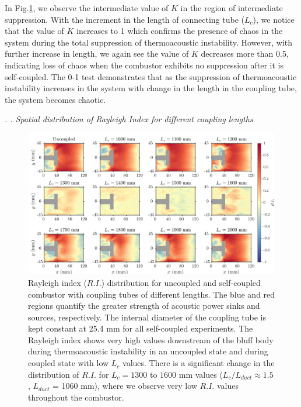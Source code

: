 \documentclass[onecolumn,12pt]{article} %
\renewcommand{\subsection}%
              [1]%
              {%
               \bgroup%
               \flushleft%
               \small\em%
               \stepcounter{subsection}%
               \arabic{section}.%
               \arabic{subsection}. #1%
               \par%
               \egroup%
              }%
\begin{document}
In Fig.\ref{chaos_fig}, we observe the intermediate value of $K$ in the region of intermediate suppression. With the increment in the length of connecting tube ($L_c$), we notice that the value of $K$ increases to 1 which confirms the presence of chaos in the system during the total suppression of thermoacoustic instability. However, with further increase in length, we again see the value of $K$ decreases more than 0.5, indicating loss of chaos when the combustor exhibits no suppression after it is self-coupled. The 0-1 test demonstrates that as the suppression of thermoacoustic instability increases in the system with change in the length in the coupling tube, the system becomes chaotic.  

\subsection{Spatial distribution of Rayleigh Index for different coupling lengths} \addvspace{10pt}

\begin{figure}[h]
\centering
\includegraphics[width=1\textwidth]{rayleigh_index_plots.png}
\caption{Rayleigh index ($R.I.$) distribution for uncoupled and self-coupled combustor with coupling tubes of different lengths. The blue and red regions quantify the greater strength of acoustic power sinks and sources, respectively. The internal diameter of the coupling tube is kept constant at 25.4 mm for all self-coupled experiments. The Rayleigh index shows very high values downstream of the bluff body during thermoacoustic instability in an uncoupled state and during coupled state with low $L_c$ values. There is a significant change in the distribution of $R.I.$ for $L_c = 1300$ to $1600$ mm values ($L_c/L_{duct} \approx 1.5$, $L_{duct}$ = 1060 mm), where we observe very low $R.I.$ values throughout the combustor. }
\label{chaos_fig}
\end{figure}
\end{document}
